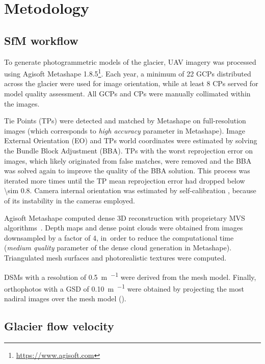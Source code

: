\section{Metodology}\label{sec:3:methodology}

\subsection{SfM workflow}\label{sec:3:sfm}

To generate photogrammetric models of the glacier, UAV imagery was processed using 
Agisoft Metashape 1.8.5\footnote{\url{https://www.agisoft.com}}.
Each year, a minimum of 22 GCPs distributed across the glacier were used for image 
orientation, while at least 8 CPs served for model quality assessment.  
All GCPs and CPs were manually collimated within the images.

Tie Points (TPs) were detected and matched by Metashape on full-resolution images (which
corresponds to \textit{high accuracy} parameter in Metashape).
Image External Orientation (EO) and TPs world coordinates were estimated by solving the
Bundle Block Adjustment (BBA).
TPs with the worst reprojection error on images, which likely originated from false
matches, were removed and the BBA was solved again to improve the quality of the BBA solution.
This process was iterated more times until the TP mean reprojection error had dropped below
\SI{\sim 0.8}{\pixel}.
Camera internal orientation was estimated by self-calibration
\citep{Fraser2013, Cramer2017}, because of its instability in the cameras employed.

Agisoft Metashape computed dense 3D reconstruction with proprietary MVS
algorithms~\citep{Dallasta}.
Depth maps and dense point clouds were obtained from images downsampled by a factor of 4,
in~order to reduce the computational time (\textit{medium quality} parameter of the dense
cloud generation in Metashape).
Triangulated mesh surfaces and photorealistic textures were computed.

DSMs with a resolution of \SI{0.5}{\meter\per\pixel} were derived from the mesh model.
Finally, orthophotos with a GSD of \SI{0.10}{\meter\per\pixel} were obtained by
projecting the most nadiral images over the mesh model ().

\subsection{Glacier flow velocity}\label{sec:3:method_velocity}

